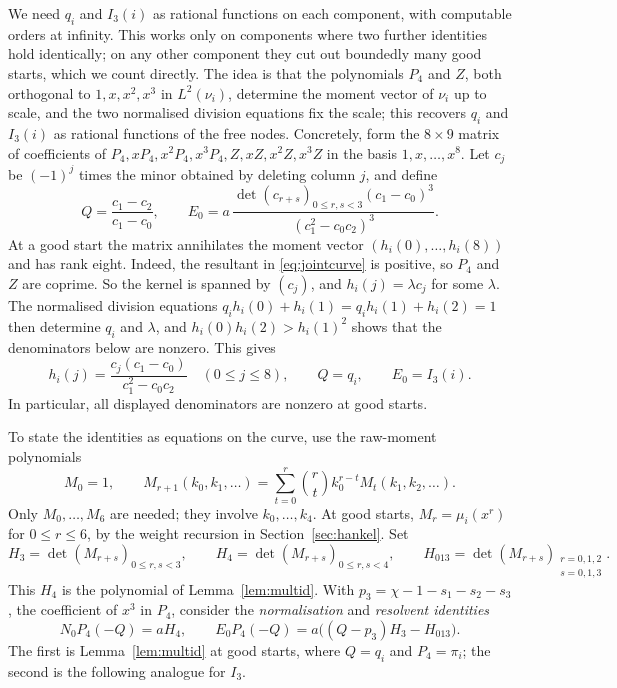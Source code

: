 \documentclass[11pt]{article}
\theoremstyle{definition}
\theoremstyle{remark}
\begin{document}
We need $q_i$ and $I_3(i)$ as rational functions on each component, with
computable orders at infinity. This works only on components where two further
identities hold identically; on any other component they cut out boundedly many
good starts, which we count directly. The idea is that the polynomials $P_4$ and $Z$, both orthogonal to
$1,x,x^2,x^3$ in $L^2(\nu_i)$, determine the
moment vector of $\nu_i$ up to scale, and the two normalised division
equations fix the scale; this recovers $q_i$ and $I_3(i)$ as rational
functions of the free nodes. Concretely, form the $8\times9$ matrix of
coefficients of $P_4,xP_4,x^2P_4,x^3P_4,Z,xZ,x^2Z,x^3Z$ in the basis
$1,x,\dots,x^8$. Let $c_j$ be $(-1)^j$ times the minor obtained by
deleting column $j$, and define
\[
 Q=\frac{c_1-c_2}{c_1-c_0},\qquad
 E_0=a\,\frac{\det(c_{r+s})_{0\le r,s<3}(c_1-c_0)^3}
                  {(c_1^2-c_0c_2)^3}.
\]
At a good start the matrix annihilates the moment vector
$(h_i(0),\dots,h_i(8))$ and has rank eight. Indeed, the resultant in
\eqref{eq:jointcurve} is positive, so $P_4$ and $Z$ are coprime.
So the kernel is spanned by $(c_j)$, and $h_i(j)=\lambda c_j$ for some $\lambda$.
The normalised division equations $q_ih_i(0)+h_i(1)=q_ih_i(1)+h_i(2)=1$ then
determine $q_i$ and $\lambda$, and $h_i(0)h_i(2)>h_i(1)^2$ shows that the
denominators below are nonzero. This gives
\[
 h_i(j)=\frac{c_j(c_1-c_0)}{c_1^2-c_0c_2}\quad(0\le j\le8),\qquad
 Q=q_i,\qquad E_0=I_3(i).
\]
In particular, all displayed denominators are nonzero at good starts.

To state the identities as equations on the curve, use the raw-moment
polynomials
\[
 M_0=1,\qquad
 M_{r+1}(k_0,k_1,\dots)
 =\sum_{t=0}^{r}\binom rt k_0^{r-t}M_t(k_1,k_2,\dots).
\]
Only $M_0,\dots,M_6$ are needed; they involve $k_0,\dots,k_4$.
At good starts, $M_r=\mu_i(x^r)$ for $0\le r\le6$, by the
weight recursion in Section~\ref{sec:hankel}. Set
\[
 H_3=\det(M_{r+s})_{0\le r,s<3},\qquad
 H_4=\det(M_{r+s})_{0\le r,s<4},\qquad
 H_{013}=\det(M_{r+s})_{\substack{r=0,1,2\\s=0,1,3}}.
\]
This $H_4$ is the polynomial of Lemma~\ref{lem:multid}. With
$p_3=\chi-1-s_1-s_2-s_3$, the coefficient of $x^3$ in $P_4$, consider the
\emph{normalisation} and \emph{resolvent identities}
\begin{equation}\label{eq:jointcuts}
 N_0P_4(-Q)=aH_4,\qquad
 E_0P_4(-Q)=a\bigl((Q-p_3)H_3-H_{013}\bigr).
\end{equation}
The first is Lemma~\ref{lem:multid} at good starts, where $Q=q_i$ and
$P_4=\pi_i$; the second is the following analogue for $I_3$.
\end{document}
